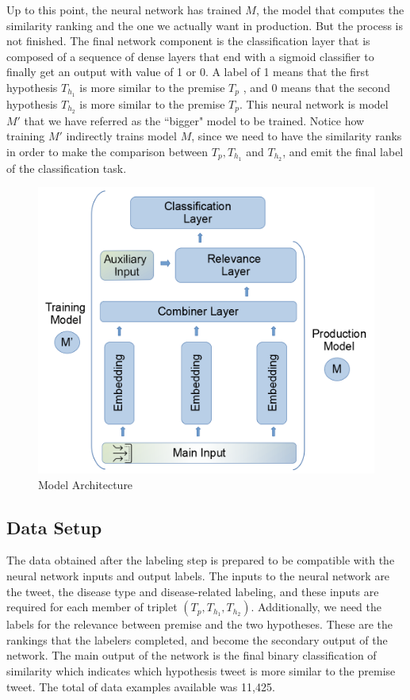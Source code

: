 \documentclass[12pt]{report}
\begin{document}
Up to this point, the neural network has trained $M$, the model that computes the similarity ranking and the one we
actually want in production. But  the process
is not finished.
The final network component is the classification layer that is composed of a sequence of dense layers that end with a sigmoid classifier to finally get an output with value of 1 or 0. A label of  1 means that the first hypothesis  $T_{h_1}$ is more similar to the premise $T_p$ , and 0 means that the second hypothesis
$T_{h_2}$ is more similar to the premise $T_p$. This neural network is model $M'$ that we have referred as the ``bigger" model to be trained. Notice how 
training $M'$ indirectly trains model $M$, since we need to have the similarity ranks in order to make the comparison between $T_p, T_{h_1}$ and $T_{h_2}$, and emit the final label of the classification task. 
\begin{figure}[htbp]	
	\centering
	\includegraphics[width=140mm, scale = 1]{images/11_all_model.png}	
	\caption{Model Architecture}	
	\label{figure:all_model}
\end{figure}


\subsection{Data Setup \label{input_setup}}
The data obtained after the labeling step is prepared to be compatible with the neural network inputs and output labels. The inputs to the neural network are the tweet, the disease type and disease-related labeling, and these inputs are required for each member of triplet $(T_p, T_{h_1},T_{h_2})$. 
Additionally, we need the labels for the relevance between premise and the two hypotheses. These are the rankings that the labelers completed,  and become the secondary output of the network. The main output of the network is the  final binary classification of similarity which  indicates which hypothesis tweet is more similar to the premise tweet. 
 The total of data examples available was 11,425.
\end{document}
